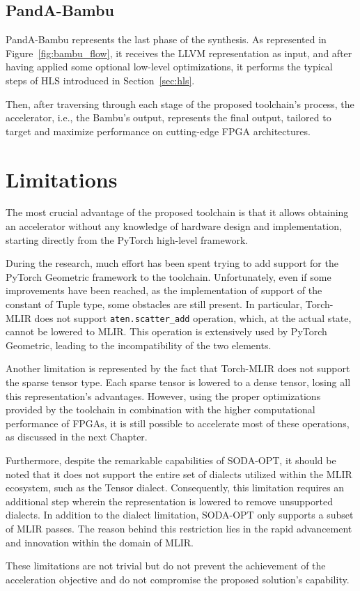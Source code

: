 \subsection{PandA-Bambu}
\label{subsec:toolchain-panda_bambu}%

PandA-Bambu represents the last phase of the synthesis.
As represented in Figure~\ref{fig:bambu_flow}, it receives the LLVM representation as input, and after having applied some optional low-level optimizations, it performs the typical steps of HLS introduced in Section~\ref{sec:hls}.

Then, after traversing through each stage of the proposed toolchain's process, the accelerator, i.e., the Bambu's output, represents the final output, tailored to target and maximize performance on cutting-edge FPGA architectures.

\section{Limitations}
\label{sec:toolchain-limitations}%

The most crucial advantage of the proposed toolchain is that it allows obtaining an accelerator without any knowledge of hardware design and implementation, starting directly from the PyTorch high-level framework.

During the research, much effort has been spent trying to add support for the PyTorch Geometric framework to the toolchain.
Unfortunately, even if some improvements have been reached, as the implementation of support of the constant of Tuple type, some obstacles are still present.
In particular, Torch-MLIR does not support \texttt{aten.scatter\_add} operation, which, at the actual state, cannot be lowered to MLIR\@.
This operation is extensively used by PyTorch Geometric, leading to the incompatibility of the two elements.

Another limitation is represented by the fact that Torch-MLIR does not support the sparse tensor type.
Each sparse tensor is lowered to a dense tensor, losing all this representation's advantages.
However, using the proper optimizations provided by the toolchain in combination with the higher computational performance of FPGAs, it is still possible to accelerate most of these operations, as discussed in the next Chapter.

Furthermore, despite the remarkable capabilities of SODA-OPT, it should be noted that it does not support the entire set of dialects utilized within the MLIR ecosystem, such as the Tensor dialect.
Consequently, this limitation requires an additional step wherein the representation is lowered to remove unsupported dialects.
In addition to the dialect limitation, SODA-OPT only supports a subset of MLIR passes.
The reason behind this restriction lies in the rapid advancement and innovation within the domain of MLIR\@.

These limitations are not trivial but do not prevent the achievement of the acceleration objective and do not compromise the proposed solution's capability.
